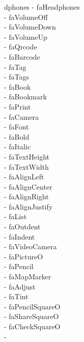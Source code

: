 \documentclass[%
               doublesided,
               paper=a4,
               fontsize=10pt
              ]{my-resume}
\begin{document}
dphones - faHeadphones\\ \faVolumeOff - faVolumeOff\\ \faVolumeDown - faVolumeDown\\ \faVolumeUp - faVolumeUp\\ \faQrcode - faQrcode\\ \faBarcode - faBarcode\\ \faTag - faTag\\ \faTags - faTags\\ \faBook - faBook\\ \faBookmark - faBookmark\\ \faPrint - faPrint\\ \faCamera - faCamera\\ \faFont - faFont\\ \faBold - faBold\\ \faItalic - faItalic\\ \faTextHeight - faTextHeight\\ \faTextWidth - faTextWidth\\ \faAlignLeft - faAlignLeft\\ \faAlignCenter - faAlignCenter\\ \faAlignRight - faAlignRight\\ \faAlignJustify - faAlignJustify\\ \faList - faList\\ \faOutdent - faOutdent\\ \faIndent - faIndent\\ \faVideoCamera - faVideoCamera\\ \faPictureO - faPictureO\\ \faPencil - faPencil\\ \faMapMarker - faMapMarker\\ \faAdjust - faAdjust\\ \faTint - faTint\\ \faPencilSquareO - faPencilSquareO\\ \faShareSquareO - faShareSquareO\\ \faCheckSquareO - faCheckSquareO\\ \faArrows - 
\end{document}
